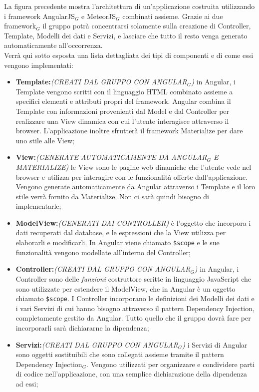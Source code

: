 La figura precedente mostra l'architettura di un'applicazione costruita utilizzando i framework AngularJS$_G$ e MeteorJS$_G$ combinati assieme. Grazie ai due framework$_G$ il gruppo potrà concentrarsi solamente sulla creazione di Controller, Template, Modelli dei dati e Servizi, e lasciare che tutto il resto venga generato automaticamente all'occorrenza. \\
Verrà qui sotto esposta una lista dettagliata dei tipi di componenti e di come essi vengono implementati:
\begin{itemize}
\item \textbf{Template:}\textit{(CREATI DAL GRUPPO CON ANGULAR$_G$)} in Angular, i Template vengono scritti con il linguaggio HTML combinato assieme a specifici elementi e attributi propri del framework. Angular combina il Template con informazioni provenienti dal Model e dal Controller per realizzare una View dinamica con cui l'utente interagisce attraverso il browser. L'applicazione inoltre sfrutterà il framework Materialize per dare uno stile alle View;
\item \textbf{View:}\textit{(GENERATE AUTOMATICAMENTE DA ANGULAR$_G$ E MATERIALIZE)} le View sono le pagine web dinamiche che l'utente vede nel browser e utilizza per interagire con le funzionalità offerte dall'applicazione. Vengono generate automaticamente da Angular attraverso i Template e il loro stile verrà fornito da Materialize. Non ci sarà quindi bisogno di implementarle;
\item \textbf{ModelView:}\textit{(GENERATI DAI CONTROLLER)} è l'oggetto che incorpora i dati recuperati dal database, e le espressioni che la View utilizza per elaborarli e modificarli. In Angular viene chiamato \texttt{\$scope} e le sue funzionalità vengono modellate all'interno del Controller; 
\item \textbf{Controller:}\textit{(CREATI DAL GRUPPO CON ANGULAR$_G$)} in Angular, i Controller sono delle \textit{funzioni} costruttore scritte in linguaggio JavaScript che sono utilizzate per estendere il ModelView, che in Angular è un oggetto chiamato \texttt{\$scope}. I Controller incorporano le definizioni dei Modelli dei dati e i vari Servizi di cui hanno bisogno attraverso il pattern Dependency Injection, completamente gestito da Angular. Tutto quello che il gruppo dovrà fare per incorporarli sarà dichiararne la dipendenza;
\item \textbf{Servizi:}\textit{(CREATI DAL GRUPPO CON ANGULAR$_G$)} i Servizi di Angular sono oggetti sostituibili che sono collegati assieme tramite il pattern Dependency Injection$_G$. Vengono utilizzati per organizzare e condividere parti di codice nell'applicazione, con una semplice dichiarazione della dipendenza ad essi;

\end{itemize}
